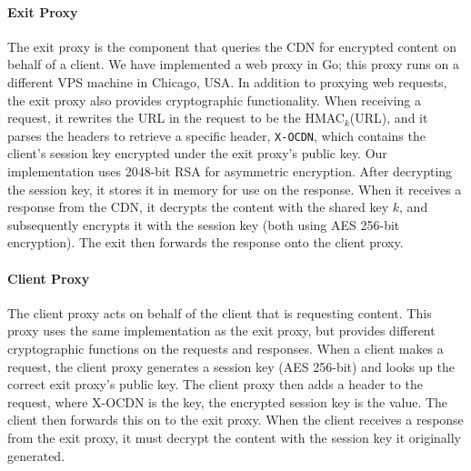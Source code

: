 \paragraph{Exit Proxy} The exit proxy is the component that queries the CDN for
encrypted
content on behalf of a client.  We have implemented a web proxy in Go; this proxy
runs on
a different VPS machine in Chicago, USA.  In addition to proxying web requests, the exit 
proxy also provides cryptographic functionality.  When receiving a request, it rewrites
the URL in the request to be the HMAC$_{k}$(URL), and it parses the headers to retrieve a 
specific header, {\tt X-OCDN}, which contains the client's session key encrypted
under the exit
proxy's public key.  Our implementation uses 2048-bit RSA for asymmetric encryption.  After 
decrypting the session key, it stores it in memory for use on the response.  When 
it receives a response from the CDN, it decrypts the content with the shared key $k$, and 
subsequently encrypts it with the session key (both using AES 256-bit encryption).  The 
exit then forwards the response onto the client proxy.

\paragraph{Client Proxy} The client proxy acts on behalf of the client that is
requesting
content.  This proxy uses the same implementation as the exit proxy, but provides 
different cryptographic functions on the requests and responses.  When a client makes 
a request, the client proxy generates a session key  (AES 256-bit) and looks up the correct exit proxy's 
public key.  The client proxy then adds a header to the request, 
where X-OCDN is the key, the encrypted session key is the value.  The client then forwards this on to the 
exit proxy.  When the client receives a response from the exit proxy, it must decrypt the content 
with the session key it originally generated.   
